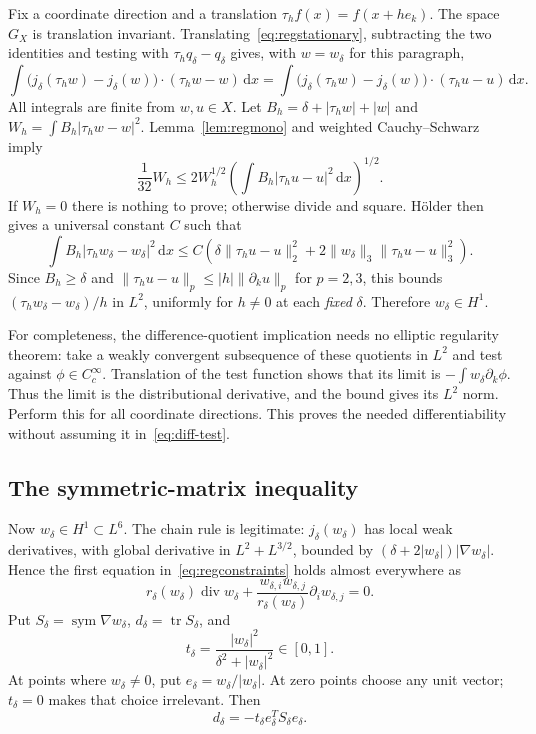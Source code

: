 \documentclass[11pt,a4paper]{article}
\theoremstyle{definition}
\newcommand{\dd}{\,\mathrm dx}
\DeclareMathOperator{\diver}{div}
\DeclareMathOperator{\sym}{sym}
\DeclareMathOperator{\tr}{tr}
\begin{document}
Fix a coordinate direction and a translation $\tau_hf(x)=f(x+he_k)$. The space $G_X$ is translation invariant. Translating~\eqref{eq:regstationary}, subtracting the two identities and testing with $\tau_hq_\delta-q_\delta$ gives, with $w=w_\delta$ for this paragraph,
\begin{equation}\label{eq:diff-test}
 \int\bigl(j_\delta(\tau_hw)-j_\delta(w)\bigr)\cdot(\tau_hw-w)\dd
 =\int\bigl(j_\delta(\tau_hw)-j_\delta(w)\bigr)\cdot(\tau_hu-u)\dd.
\end{equation}
All integrals are finite from $w,u\in X$. Let $B_h=\delta+|\tau_hw|+|w|$ and
$W_h=\int B_h|\tau_hw-w|^2$. Lemma~\ref{lem:regmono} and weighted Cauchy--Schwarz imply
\[
 \frac1{32}W_h
 \le2W_h^{1/2}\left(\int B_h|\tau_hu-u|^2\dd\right)^{1/2}.
\]
If $W_h=0$ there is nothing to prove; otherwise divide and square. H\"older then gives a universal constant $C$ such that
\begin{equation}\label{eq:difference-bound}
 \int B_h|\tau_hw_\delta-w_\delta|^2\dd
 \le C\left(\delta\|\tau_hu-u\|_2^2
       +2\|w_\delta\|_3\|\tau_hu-u\|_3^2\right).
\end{equation}
Since $B_h\ge\delta$ and $\|\tau_hu-u\|_p\le |h|\|\partial_ku\|_p$ for $p=2,3$, this bounds $(\tau_hw_\delta-w_\delta)/h$ in $L^2$, uniformly for $h\ne0$ at each \emph{fixed} $\delta$. Therefore $w_\delta\in H^1$.

For completeness, the difference-quotient implication needs no elliptic regularity theorem: take a weakly convergent subsequence of these quotients in $L^2$ and test against $\phi\in C_c^\infty$. Translation of the test function shows that its limit is $-\int w_\delta\partial_k\phi$. Thus the limit is the distributional derivative, and the bound gives its $L^2$ norm. Perform this for all coordinate directions. This proves the needed differentiability without assuming it in~\eqref{eq:diff-test}.

\subsection{The symmetric-matrix inequality}
Now $w_\delta\in H^1\subset L^6$. The chain rule is legitimate: $j_\delta(w_\delta)$ has local weak derivatives, with global derivative in $L^2+L^{3/2}$, bounded by $(\delta+2|w_\delta|)|\nabla w_\delta|$. Hence the first equation in~\eqref{eq:regconstraints} holds almost everywhere as
\[
 r_\delta(w_\delta)\diver w_\delta
 +\frac{w_{\delta,i}w_{\delta,j}}{r_\delta(w_\delta)}\partial_iw_{\delta,j}=0.
\]
Put $S_\delta=\sym\nabla w_\delta$, $d_\delta=\tr S_\delta$, and
\[
 t_\delta=\frac{|w_\delta|^2}{\delta^2+|w_\delta|^2}\in[0,1].
\]
At points where $w_\delta\ne0$, put $e_\delta=w_\delta/|w_\delta|$. At zero points choose any unit vector; $t_\delta=0$ makes that choice irrelevant. Then
\begin{equation}\label{eq:trace-constraint}
 d_\delta=-t_\delta e_\delta^TS_\delta e_\delta.
\end{equation}
\end{document}
